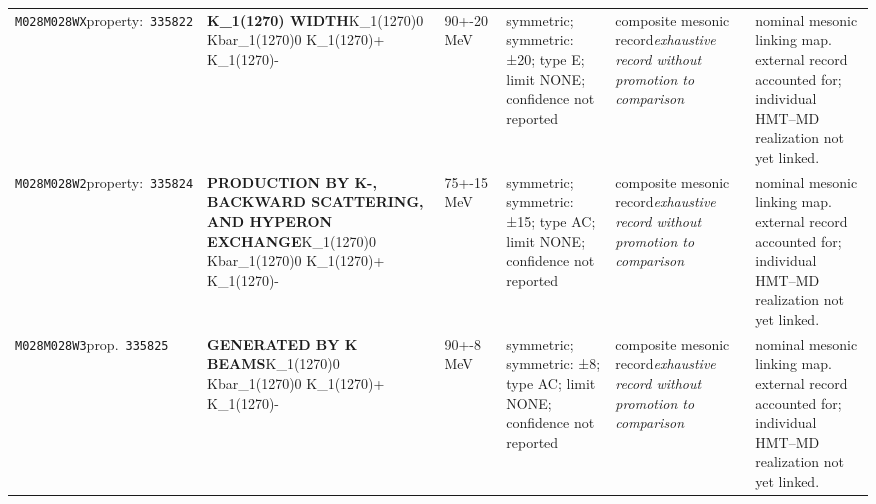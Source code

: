 \begin{landscape}
\begin{longtable}{L{1.85cm}L{4.45cm}L{2.35cm}L{4.05cm}L{3.35cm}L{7.15cm}}
\texttt{M028}\newline \texttt{M028WX}\newline property:\ \texttt{335822} & \textbf{K\_\allowbreak{}1(1270) WIDTH}\newline K\_\allowbreak{}1(1270)0 \textbar{}\allowbreak{} Kbar\_\allowbreak{}1(1270)0 \textbar{}\allowbreak{} K\_\allowbreak{}1(1270)+ \textbar{}\allowbreak{} K\_\allowbreak{}1(1270)- & 90+-20\,MeV & symmetric; symmetric: ±20; type E; limit NONE; confidence not reported & composite mesonic record\newline \emph{exhaustive record without promotion to comparison} & nominal mesonic linking map. external record accounted for; individual HMT--MD realization not yet linked. \\
\texttt{M028}\newline \texttt{M028W2}\newline property:\ \texttt{335824} & \textbf{PRODUCTION BY K-, BACKWARD SCATTERING, AND HYPERON EXCHANGE}\newline K\_\allowbreak{}1(1270)0 \textbar{}\allowbreak{} Kbar\_\allowbreak{}1(1270)0 \textbar{}\allowbreak{} K\_\allowbreak{}1(1270)+ \textbar{}\allowbreak{} K\_\allowbreak{}1(1270)- & 75+-15\,MeV & symmetric; symmetric: ±15; type AC; limit NONE; confidence not reported & composite mesonic record\newline \emph{exhaustive record without promotion to comparison} & nominal mesonic linking map. external record accounted for; individual HMT--MD realization not yet linked. \\
\texttt{M028}\newline \texttt{M028W3}\newline prop.\ \texttt{335825} & \textbf{GENERATED BY K BEAMS}\newline K\_\allowbreak{}1(1270)0 \textbar{}\allowbreak{} Kbar\_\allowbreak{}1(1270)0 \textbar{}\allowbreak{} K\_\allowbreak{}1(1270)+ \textbar{}\allowbreak{} K\_\allowbreak{}1(1270)- & 90+-8\,MeV & symmetric; symmetric: ±8; type AC; limit NONE; confidence not reported & composite mesonic record\newline \emph{exhaustive record without promotion to comparison} & nominal mesonic linking map. external record accounted for; individual HMT--MD realization not yet linked. \\

\end{longtable}
\end{landscape}
